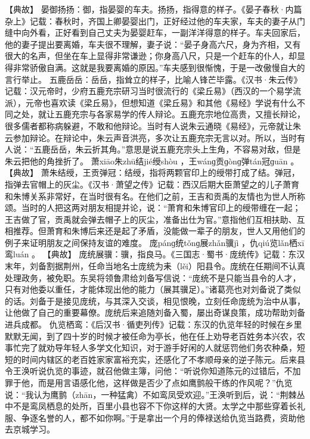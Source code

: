 \documentclass[12pt,UTF8]{ctexbook}
\begin{document}
【典故】
晏御扬扬：御，指晏婴的车夫。扬扬，指得意的样子。《晏子春秋·内篇杂上》记载：春秋时，齐国上卿晏婴出门，正好经过他的车夫家，车夫的妻子从门缝中向外看，正好看到自己丈夫为晏婴赶车，一副洋洋得意的样子。车夫回家后，他的妻子提出要离婚，车夫很不理解，妻子说：“晏子身高六尺，身为齐相，又有很大的名声，但坐在车上显得非常谦逊；你身高八尺，只是一个赶车的仆人，却显得非常骄傲自满。这就是我要离婚的原因。”车夫感到很惭愧，于是一改傲慢自大的言行举止。
五鹿岳岳：岳岳，指耸立的样子，比喻人锋芒毕露。《汉书·朱云传》记载：汉元帝时，少府五鹿充宗研习当时很流行的《梁丘易》（西汉的一个易学流派），元帝也喜欢读《梁丘易》，但想知道《梁丘易》和其他《易经》学说有什么不同之处，就让五鹿充宗与各家易学的传人辩论。五鹿充宗地位高贵，又擅长辩论，很多儒者都称病躲避，不敢和他辩论。当时有人说朱云通晓《易经》，元帝就让朱云参加辩论。在辩论中，朱云声音洪亮，多次让五鹿充宗无言以对。所以，当时有人说：“五鹿岳岳，朱云折其角。”意思是说五鹿充宗头上生角，不容易对敌，但是朱云把他的角挫折了。
萧xiāo朱zhū结jié绶shòu
，王wánɡ贡ɡònɡ弹tán冠ɡuān
。
【典故】
萧朱结绶，王贡弹冠：结绶，指将两颗官印上的绶带打成了结。弹冠，指弹去官帽上的灰尘。《汉书·萧望之传》记载：西汉后期大臣萧望之的儿子萧育和朱博关系非常好，在当时很有名。在他们之前，王吉和贡禹的友情也为世人所称颂。当时的人把这两对朋友相提并论，说：“萧育和朱博官印上的绶带缠在一起；王吉做了官，贡禹就会弹去帽子上的灰尘，准备出仕为官。”意指他们互相扶助、互相推荐。但萧育和朱博后来还是起了矛盾，没能做一辈子的朋友，世人又用他们的例子来证明朋友之间保持友谊的难度。
庞pánɡ统tǒnɡ展zhǎn骥jì
，仇qiú览lǎn栖xī鸾luán
。
【典故】
庞统展骥：骥，指良马。《三国志·蜀书·庞统传》记载：东汉末年，刘备割据荆州，任命当地名士庞统为耒（lěi）阳县令。庞统在任期间不认真处理政务，被免职。东吴将领鲁肃给刘备写信说：“庞统不是只能当县令的人才，只有对他委以重任，才能体现出他的能力（展其骥足）。”诸葛亮也对刘备说了类似的话。刘备于是接见庞统，与其深入交谈，相见恨晚，立刻任命庞统为治中从事，让他做了自己的重要幕僚。庞统后来追随刘备入蜀，屡出奇谋良策，成功帮助刘备进兵成都。
仇览栖鸾：《后汉书·循吏列传》记载：东汉的仇览年轻的时候在乡里默默无闻，到了四十岁的时候才被任命为亭长，他在任上劝导老百姓务本兴农，农事忙完了就劝导年轻人多学文化知识，对于游手好闲的人就惩罚他们务农种桑，短短的时间内辖区的老百姓家家富裕充实，还感化了不孝顺母亲的逆子陈元。后来县令王涣听说仇览的事迹，就召他做主簿，问他：“听说你知道陈元的过错后，不加罪于他，而是用言语感化他，这样做是否少了点如鹰鹯般干练的作风呢？”仇览说：“我认为鹰鹯（zhān，一种猛禽）不如鸾凤受欢迎。”王涣听到后，说：“荆棘丛中不是鸾凤栖息的处所，百里小县也容不下你这样的大贤。太学之中那些穿着长礼服、争逐名誉的人，都不如你啊。”于是拿出一个月的俸禄送给仇览当路费，资助他去京城学习。
\end{document}
